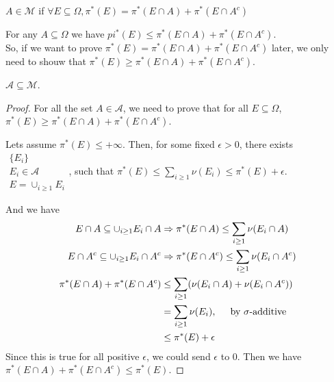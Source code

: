 \begin{define}
  $A\in\mathcal{M}$ if $\forall E\subseteq\Omega, \pi^*(E) = \pi^*(E\cap A) + \pi^*(E\cap A^c)$
\end{define}
\begin{observation}
  For any $A\subseteq\Omega$ we have $pi^*(E) \leq \pi^*(E\cap A) + \pi^*(E\cap A^c)$. \\
  So, if we want to prove $\pi^*(E) = \pi^*(E\cap A) + \pi^*(E\cap A^c)$ later,
  we only need to shouw that $\pi^*(E) \geq \pi^*(E\cap A) + \pi^*(E\cap A^c)$.
\end{observation}
\begin{fact}
  $\mathcal{A}\subseteq \mathcal{M}$.
\end{fact}
\begin{proof}
  For all the set $A\in\mathcal{A}$, we need to prove that
  for all $E\subseteq\Omega$, $\pi^*(E) \geq \pi^*(E\cap A) + \pi^*(E\cap A^c)$.

  Lets assume $\pi^*(E) \leq +\infty$.
  Then, for some fixed $\epsilon > 0$, there exists $\substack{\{E_i\}\\E_i\in\mathcal{A}\\E=\cup_{i\geq 1} E_i}$,
  such that $\pi^*(E) \leq \sum_{i\geq 1} \nu(E_i) \leq \pi^*(E) + \epsilon$.

  And we have
  \begin{align*}
    E\cap A \subseteq \cup_{i\geq 1} E_i\cap A &\Rightarrow \pi^*(E\cap A) \leq \sum_{i\geq 1} \nu(E_i\cap A) \\
    E\cap A^c \subseteq \cup_{i\geq 1} E_i\cap A^c &\Rightarrow \pi^*(E\cap A^c) \leq \sum_{i\geq 1} \nu(E_i\cap A^c) \\
    \pi^*(E\cap A) + \pi^*(E\cap A^c) &\leq \sum_{i\geq 1} (\nu(E_i\cap A) + \nu(E_i\cap A^c)) \\
                                               &= \sum_{i\geq 1} \nu(E_i), \hspace{0.5cm} \mbox{by $\sigma$-additive} \\
                                               &\leq \pi^*(E) + \epsilon
  \end{align*}
  Since this is true for all positive $\epsilon$, we could send $\epsilon$ to $0$.
  Then we have $\pi^*(E\cap A) + \pi^*(E\cap A^c) \leq \pi^*(E)$.
\end{proof}
